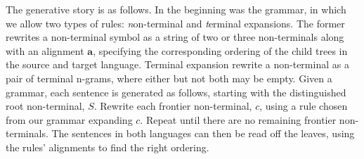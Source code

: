 The generative story is as follows. 
In the beginning was the grammar, in which we allow  two types of rules: {\emph non-terminal} and {\emph terminal} expansions. 
The former rewrites a non-terminal symbol as a string of two or three non-terminals along with an alignment $\mathbf{a}$, specifying the corresponding ordering of the child trees in the source and target language. 
Terminal expansion rewrite a non-terminal as a pair of terminal n-grams, where either but not both may be empty. 
Given a grammar, each sentence is generated as follows, starting with the distinguished root non-terminal, $S$. 
Rewrite each frontier non-terminal, $c$, using a rule chosen from our grammar expanding $c$. 
Repeat until there are no remaining frontier non-terminals. 
The sentences in both languages can then be read off the leaves, using the rules' alignments to find the right ordering. 


